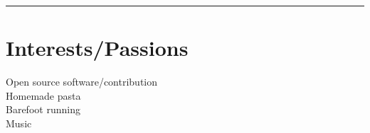 \documentclass[letterpaper]{deedy-resume}
\begin{document}
\begin{minipage}[t]{0.3\textwidth}

\sectionspace
\vspace{-1ex}
\rule{5cm}{0.5pt}

\vspace{2em}
\section{Interests/Passions}
\vspace{1em}
\textbullet{} Open source software/contribution\\
\textbullet{} Homemade pasta\\
\textbullet{} Barefoot running\\
\textbullet{} Music\\

\end{minipage} %
\hfill
\vrule
\hspace{3ex}
%
%
\end{document}
